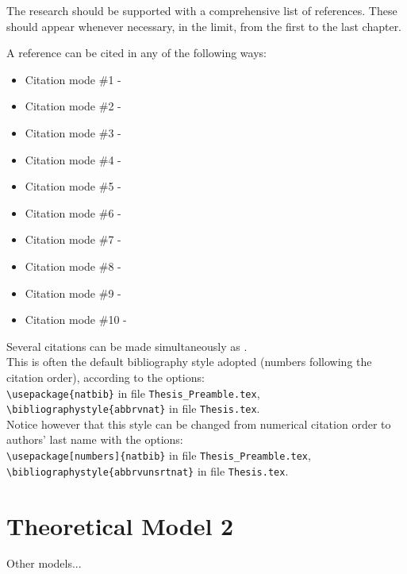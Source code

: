 The research should be supported with a comprehensive list of references.
These should appear whenever necessary, in the limit, from the first to the last chapter.

A reference can be cited in any of the following ways:
%
\begin{itemize}
  \item Citation mode \#1 - \quad \cite{jameson:adjointns}
  \item Citation mode \#2 - \quad \citet{jameson:adjointns}
  \item Citation mode \#3 - \quad \citep{jameson:adjointns}
  \item Citation mode \#4 - \quad \citet*{jameson:adjointns}
  \item Citation mode \#5 - \quad \citep*{jameson:adjointns}
  \item Citation mode \#6 - \quad \citealt{jameson:adjointns}
  \item Citation mode \#7 - \quad \citealp{jameson:adjointns}
  \item Citation mode \#8 - \quad \citeauthor{jameson:adjointns}
  \item Citation mode \#9 - \quad \citeyear{jameson:adjointns}
  \item Citation mode \#10 - \quad \citeyearpar{jameson:adjointns}
\end{itemize}
%
Several citations can be made simultaneously as \citep{nocedal:opt,marta:ijcfd}. \\

This is often the default bibliography style adopted (numbers following the citation order), according to the options:\\
{\tt \textbackslash usepackage\{natbib\}} in file {\tt Thesis\_Preamble.tex},\\
{\tt \textbackslash bibliographystyle\{abbrvnat\}} in file {\tt Thesis.tex}.\\
%
Notice however that this style can be changed from numerical citation order to authors' last name with the options: \\
{\tt \textbackslash usepackage[numbers]\{natbib\}} in file {\tt Thesis\_Preamble.tex},\\
{\tt \textbackslash bibliographystyle\{abbrvunsrtnat\}} in file {\tt Thesis.tex}.


\section{Theoretical Model 2}
\label{section:theory2}

Other models...
